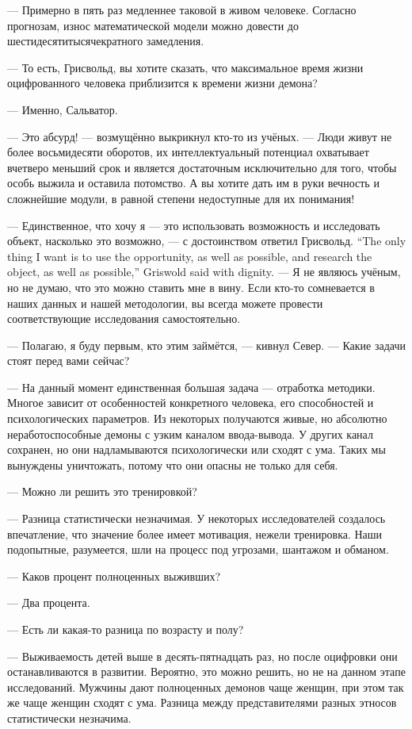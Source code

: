 --- Примерно в пять раз медленнее таковой в живом человеке.
Согласно прогнозам, износ математической модели можно довести до шестидесятитысячекратного замедления.

--- То есть, Грисвольд, вы хотите сказать, что максимальное время жизни оцифрованного человека приблизится к времени жизни демона?

--- Именно, Сальватор.

--- Это абсурд! --- возмущённо выкрикнул кто-то из учёных.
--- Люди живут не более восьмидесяти оборотов, их интеллектуальный потенциал охватывает вчетверо меньший срок и является достаточным исключительно для того, чтобы особь выжила и оставила потомство.
А вы хотите дать им в руки вечность и сложнейшие модули, в равной степени недоступные для их понимания!

{--- Единственное, что хочу я --- это использовать возможность и исследовать объект, насколько это возможно, --- с достоинством ответил Грисвольд.}
{``The only thing I want is to use the opportunity, as well as possible, and research the object, as well as possible,'' Griswold said with dignity.}
--- Я не являюсь учёным, но не думаю, что это можно ставить мне в вину.
Если кто-то сомневается в наших данных и нашей методологии, вы всегда можете провести соответствующие исследования самостоятельно.

--- Полагаю, я буду первым, кто этим займётся, --- кивнул Север.
--- Какие задачи стоят перед вами сейчас?

--- На данный момент единственная большая задача --- отработка методики.
Многое зависит от особенностей конкретного человека, его способностей и психологических параметров.
Из некоторых получаются живые, но абсолютно неработоспособные демоны с узким каналом ввода-вывода.
У других канал сохранен, но они надламываются психологически или сходят с ума.
Таких мы вынуждены уничтожать, потому что они опасны не только для себя.

--- Можно ли решить это тренировкой?

--- Разница статистически незначимая.
У некоторых исследователей создалось впечатление, что значение более имеет мотивация, нежели тренировка.
Наши подопытные, разумеется, шли на процесс под угрозами, шантажом и обманом.

--- Каков процент полноценных выживших?

--- Два процента.

--- Есть ли какая-то разница по возрасту и полу?

--- Выживаемость детей выше в десять-пятнадцать раз, но после оцифровки они останавливаются в развитии.
Вероятно, это можно решить, но не на данном этапе исследований.
Мужчины дают полноценных демонов чаще женщин, при этом так же чаще женщин сходят с ума.
Разница между представителями разных этносов статистически незначима.

